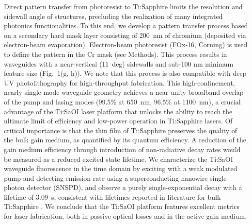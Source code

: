 \documentclass[amsmath, amsthm, amssymb, aps, prb, superscriptaddress, twocolumn, nofootinbib, 10pt]{revtex4-1}%
\begin{document}
Direct pattern transfer from photoresist to Ti:Sapphire limits the resolution and sidewall angle of structures, precluding the realization of many integrated photonics functionalities. To this end, we develop a pattern transfer process based on a secondary hard mask layer consisting of 200~nm of chromium (deposited via electron-beam evaporation). Electron-beam photoresist (FOx-16, Corning) is used to define the pattern in the Cr mask (see Methods). This process results in waveguides with a near-vertical (11~deg) sidewalls and sub-100 nm minimum feature size (Fig.~1(g, h)). We note that this process is also compatible with deep UV photolithography for high-throughput fabrication\cite{tran2022extending}. This high-confinement, nearly single-mode waveguide geometry achieves a near-unity broadband overlap of the pump and lasing modes (99.5\% at 650~nm, 96.5\% at 1100~nm), a crucial advantage of the Ti:SaOI laser platform that unlocks the ability to reach the ultimate limit of efficiency and low-power operation in Ti:Sapphire lasers. Of critical importance is that the thin film of Ti:Sapphire preserves the quality of the bulk gain medium, as quantified by its quantum efficiency.  A reduction of the gain medium efficiency through introduction of non-radiative decay rates would be measured as a reduced excited state lifetime. We characterize the Ti:SaOI waveguide fluorescence in the time domain by exciting with a weak modulated pump and detecting emission rate using a superconducting nanowire single-photon detector (SNSPD), and observe a purely single-exponential decay with a lifetime of 3.09~\textmu s, consistent with lifetimes reported in literature for bulk Ti:Sapphire \cite{moulton1986spectroscopic}. We conclude that the Ti:SaOI platform features excellent metrics for laser fabrication, both in passive optical losses and in the active gain medium.
\end{document}
